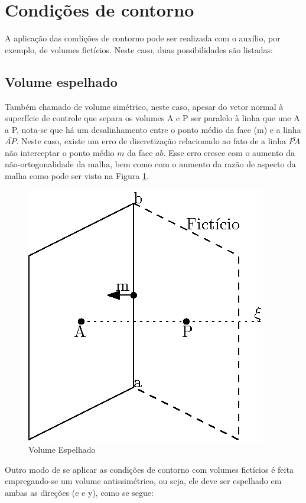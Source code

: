 \section{Condições de contorno}
A aplicação das condições de contorno pode ser realizada com o auxílio, por exemplo, de volumes fictícios. Neste caso, duas possibilidades são listadas:

\subsection{Volume espelhado}

Também chamado de volume simétrico, neste caso, apesar do vetor normal à superfície de controle que separa os volumes A e P ser paralelo à linha que une A a P, nota-se que há um desalinhamento entre o ponto médio da face (m) e a linha $\bar{AP}$. Neste caso, existe um erro de discretização relacionado ao fato de a linha $\bar{PA}$ não interceptar o ponto médio $m$ da face $ab$. Esse erro cresce com o aumento da não-ortogonalidade da malha, bem como com o aumento da razão de aspecto da malha como pode ser visto na Figura \ref{contorno-1}.

\begin{figure}[h]
    \centering
    \includegraphics{fig/contorno-1.eps}
    \caption{Volume Espelhado}
    \label{contorno-1}
\end{figure}

Outro modo de se aplicar as condições de contorno com volumes fictícios é feita empregando-se um volume antissimétrico, ou seja, ele deve ser espelhado em ambas as direções (e e y), como se segue:

